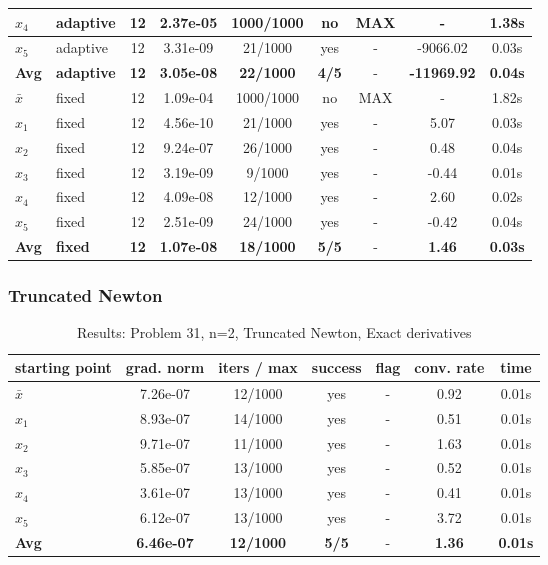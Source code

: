 \begin{longtable}{|l|l|c|c|c|c|c|c|c|}
\hline
$x_4$ & adaptive & 12 & 2.37e-05 & 1000/1000 & no & MAX & - & 1.38s \\
\hline
$x_5$ & adaptive & 12 & 3.31e-09 & 21/1000 & yes & - & -9066.02 & 0.03s \\
\hline
\hline\hline
\textbf{Avg} & \textbf{adaptive} & \textbf{12} & \textbf{3.05e-08} & \textbf{22/1000} & \textbf{4/5} & - & \textbf{-11969.92} & \textbf{0.04s} \\
\hline\hline
\hline
$\bar{x}$ & fixed & 12 & 1.09e-04 & 1000/1000 & no & MAX & - & 1.82s \\
\hline
$x_1$ & fixed & 12 & 4.56e-10 & 21/1000 & yes & - & 5.07 & 0.03s \\
\hline
$x_2$ & fixed & 12 & 9.24e-07 & 26/1000 & yes & - & 0.48 & 0.04s \\
\hline
$x_3$ & fixed & 12 & 3.19e-09 & 9/1000 & yes & - & -0.44 & 0.01s \\
\hline
$x_4$ & fixed & 12 & 4.09e-08 & 12/1000 & yes & - & 2.60 & 0.02s \\
\hline
$x_5$ & fixed & 12 & 2.51e-09 & 24/1000 & yes & - & -0.42 & 0.04s \\
\hline
\hline\hline
\textbf{Avg} & \textbf{fixed} & \textbf{12} & \textbf{1.07e-08} & \textbf{18/1000} & \textbf{5/5} & - & \textbf{1.46} & \textbf{0.03s} \\
\hline\hline
\end{longtable}


\subsubsection{Truncated Newton}

\begin{longtable}{|l|c|c|c|c|c|c|}
\caption{Results: Problem 31, n=2, Truncated Newton, Exact derivatives} \\
\hline
\textbf{starting point} & \textbf{grad. norm} & \textbf{iters / max} & \textbf{success} & \textbf{flag} & \textbf{conv. rate} & \textbf{time} \\
\hline
\endfirsthead
\endhead
\endfoot
\hline
\endlastfoot
$\bar{x}$ & 7.26e-07 & 12/1000 & yes & - & 0.92 & 0.01s \\
\hline
$x_1$ & 8.93e-07 & 14/1000 & yes & - & 0.51 & 0.01s \\
\hline
$x_2$ & 9.71e-07 & 11/1000 & yes & - & 1.63 & 0.01s \\
\hline
$x_3$ & 5.85e-07 & 13/1000 & yes & - & 0.52 & 0.01s \\
\hline
$x_4$ & 3.61e-07 & 13/1000 & yes & - & 0.41 & 0.01s \\
\hline
$x_5$ & 6.12e-07 & 13/1000 & yes & - & 3.72 & 0.01s \\
\hline
\hline\hline
\textbf{Avg} & \textbf{6.46e-07} & \textbf{12/1000} & \textbf{5/5} & - & \textbf{1.36} & \textbf{0.01s} \\
\hline\hline
\end{longtable}


